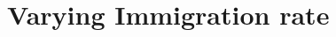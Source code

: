 %

\let\textcircled=\pgftextcircled
\chapter{Varying Immigration rate}
\label{chap:varying_immigration_rate}



